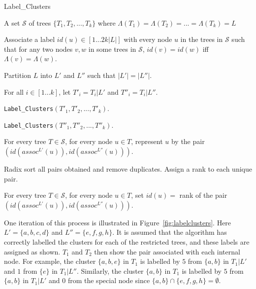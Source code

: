 \documentclass{article}
\newcommand{\leafset}{\Lambda}
\begin{document}
    \begin{algorithm}
        \caption{Label\_Clusters}
        \label{alg:labelclusters}

        \begin{algorithmic}[1]
            \Input A set $\mathcal{S}$ of trees $\{T_1, T_2, ..., T_k\}$ where $\leafset(T_1) = \leafset(T_2) = ... = \leafset(T_k) = L$

            \Output Associate a label $id(u) \in [1 ... 2k |L|]$ with every node $u$ in the trees in $\mathcal{S}$ such that for any two nodes $v, w$ in some trees in $\mathcal{S}$, $id(v) = id(w)$ iff $\leafset(v) = \leafset(w)$.

            \State Partition $L$ into $L'$ and $L''$ such that $|L'| = |L''|$.

            \State For all $i \in [1 ... k]$, let $T'_i = T_i|L'$ and $T''_i = T_i|L''$.

            \State \texttt{Label\_Clusters}$(T'_1, T'_2, ..., T'_k)$.

            \State \texttt{Label\_Clusters}$(T''_1, T''_2, ..., T''_k)$.

            \State For every tree $T \in \mathcal{S}$, for every node $u \in T$, represent $u$ by the pair $(id(assoc^{L'}(u)), id(assoc^{L''}(u)))$.

            \State Radix sort all pairs obtained and remove duplicates. Assign a rank to each unique pair.

            \State For every tree $T \in \mathcal{S}$, for every node $u \in T$, set $id(u) = $ rank of the pair $(id(assoc^{L'}(u)), id(assoc^{L''}(u)))$.
        \end{algorithmic}
    \end{algorithm}

    One iteration of this process is illustrated in Figure~\ref{fig:labelclusters}. Here $L' = \{a, b, c, d\}$ and $L'' = \{e, f, g, h\}$. It is assumed that the algorithm has correctly labelled the clusters for each of the restricted trees, and these labels are assigned as shown. $T_1$ and $T_2$ then show the pair associated with each internal node. For example, the cluster $\{a, b, e\}$ in $T_1$ is labelled by $5$ from $\{a, b\}$ in $T_1|L'$ and $1$ from $\{e\}$ in $T_1|L''$. Similarly, the cluster $\{a, b\}$ in $T_1$ is labelled by $5$ from $\{a, b\}$ in $T_1|L'$ and $0$ from the special node since $\{a, b\} \cap \{e, f, g, h\} = \emptyset$.
\end{document}
